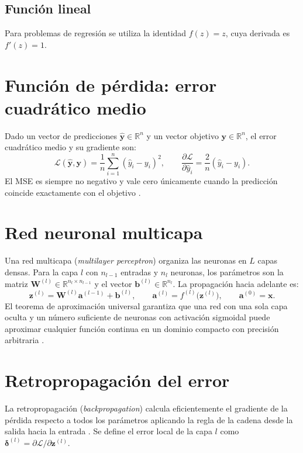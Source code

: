 \subsection{Función lineal}
Para problemas de regresión se utiliza la identidad $f(z)=z$, cuya derivada es $f'(z)=1$.

\section{Función de pérdida: error cuadrático medio}
Dado un vector de predicciones $\hat{\mathbf{y}}\in\mathbb{R}^{n}$ y un vector objetivo $\mathbf{y}\in\mathbb{R}^{n}$, el error cuadrático medio y su gradiente son:
\begin{equation}
\mathcal{L}(\hat{\mathbf{y}},\mathbf{y}) = \frac{1}{n}\sum_{i=1}^{n}(\hat{y}_i - y_i)^2, \qquad \frac{\partial\mathcal{L}}{\partial \hat{y}_i} = \frac{2}{n}(\hat{y}_i - y_i).\label{eq:mse}
\end{equation}
El MSE es siempre no negativo y vale cero únicamente cuando la predicción coincide exactamente con el objetivo \citep{bishop2006}.

\section{Red neuronal multicapa}
Una red multicapa (\emph{multilayer perceptron}) organiza las neuronas en $L$ capas densas. Para la capa $l$ con $n_{l-1}$ entradas y $n_l$ neuronas, los parámetros son la matriz $\mathbf{W}^{(l)}\in\mathbb{R}^{n_l\times n_{l-1}}$ y el vector $\mathbf{b}^{(l)}\in\mathbb{R}^{n_l}$. La propagación hacia adelante es:
\begin{equation}
\mathbf{z}^{(l)} = \mathbf{W}^{(l)}\mathbf{a}^{(l-1)} + \mathbf{b}^{(l)}, \qquad \mathbf{a}^{(l)} = f^{(l)}\bigl(\mathbf{z}^{(l)}\bigr), \qquad \mathbf{a}^{(0)} = \mathbf{x}.\label{eq:forward}
\end{equation}
El teorema de aproximación universal garantiza que una red con una sola capa oculta y un número suficiente de neuronas con activación sigmoidal puede aproximar cualquier función continua en un dominio compacto con precisión arbitraria \citep{cybenko1989,hornik1989}.

\section{Retropropagación del error}
La retropropagación (\emph{backpropagation}) calcula eficientemente el gradiente de la pérdida respecto a todos los parámetros aplicando la regla de la cadena desde la salida hacia la entrada \citep{rumelhart1986}. Se define el error local de la capa $l$ como $\boldsymbol{\delta}^{(l)} = \partial\mathcal{L}/\partial\mathbf{z}^{(l)}$.

